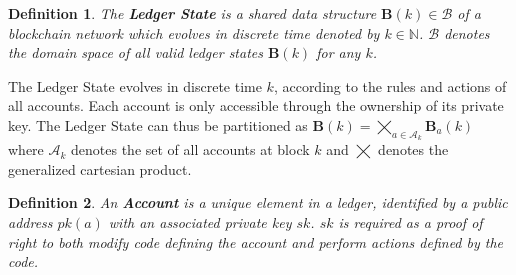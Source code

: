 \documentclass[letterpaper, 10 pt, conference]{ieeeconf}  %
\newtheorem{definition}{Definition}
\begin{document}
\begin{definition} The \textbf{Ledger State} is a shared data structure $\mathbf{B}(k)\in\mathcal{B}$ of a blockchain network which evolves in discrete time denoted by $k\in \mathbb{N}$. $\mathcal{B}$ denotes the domain space of all valid ledger states $\mathbf{B}(k)$ for any $k$.
\end{definition}


The Ledger State evolves in discrete time $k$, according to the rules and actions of all accounts. Each account is only accessible through the ownership of its private key. The Ledger State can thus be partitioned as $\mathbf{B}(k) = \bigtimes_{a\in \mathcal{A}_k } \mathbf{B}_a(k)$ where $\mathcal{A}_k$ denotes the set of all accounts at block $k$ and $\bigtimes$ denotes the generalized cartesian product. 



\begin{definition}\label{account}
An \textbf{Account} is a unique element in a ledger, identified by a public address $pk(a)$ with an associated private key $sk$. $sk$ is required as a proof of right to both modify code defining the account and perform actions defined by the code.
\end{definition}

\end{document}
